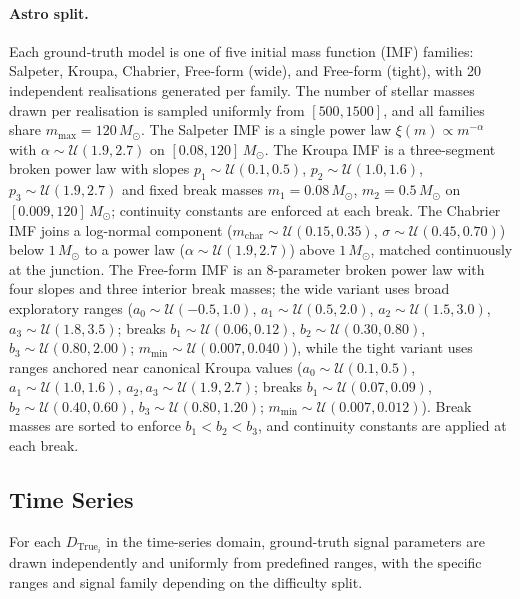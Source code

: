 \documentclass{article}
\begin{document}
\paragraph{Astro split.}
Each ground-truth model is one of five initial mass function (IMF) families:
Salpeter, Kroupa, Chabrier, Free-form (wide), and Free-form (tight), with 20
independent realisations generated per family. The number of stellar masses
drawn per realisation is sampled uniformly from $[500, 1500]$, and all
families share $m_{\max} = 120\,M_\odot$. The Salpeter IMF is a
single power law $\xi(m) \propto m^{-\alpha}$ with $\alpha \sim \mathcal{U}(1.9,
2.7)$ on $[0.08, 120]\,M_\odot$. The Kroupa IMF is a three-segment broken
power law with slopes $p_1 \sim \mathcal{U}(0.1, 0.5)$, $p_2 \sim
\mathcal{U}(1.0, 1.6)$, $p_3 \sim \mathcal{U}(1.9, 2.7)$ and fixed break
masses $m_1 = 0.08\,M_\odot$, $m_2 = 0.5\,M_\odot$ on $[0.009,
120]\,M_\odot$; continuity constants are enforced at each break. The Chabrier
IMF joins a log-normal component ($m_{\text{char}} \sim \mathcal{U}(0.15,
0.35)$, $\sigma \sim \mathcal{U}(0.45, 0.70)$) below $1\,M_\odot$ to a power
law ($\alpha \sim \mathcal{U}(1.9, 2.7)$) above $1\,M_\odot$, matched
continuously at the junction. The Free-form IMF is an 8-parameter broken power
law with four slopes and three interior break masses; the wide variant uses
broad exploratory ranges ($a_0 \!\sim\! \mathcal{U}(-0.5, 1.0)$,
$a_1 \!\sim\! \mathcal{U}(0.5, 2.0)$, $a_2 \!\sim\! \mathcal{U}(1.5, 3.0)$,
$a_3 \!\sim\! \mathcal{U}(1.8, 3.5)$; breaks $b_1 \!\sim\! \mathcal{U}(0.06,
0.12)$, $b_2 \!\sim\! \mathcal{U}(0.30, 0.80)$, $b_3 \!\sim\! \mathcal{U}(0.80,
2.00)$; $m_{\min} \!\sim\! \mathcal{U}(0.007, 0.040)$), while the tight variant
uses ranges anchored near canonical Kroupa values ($a_0 \!\sim\!
\mathcal{U}(0.1, 0.5)$, $a_1 \!\sim\! \mathcal{U}(1.0, 1.6)$,
$a_2, a_3 \!\sim\! \mathcal{U}(1.9, 2.7)$; breaks $b_1 \!\sim\!
\mathcal{U}(0.07, 0.09)$, $b_2 \!\sim\! \mathcal{U}(0.40, 0.60)$,
$b_3 \!\sim\! \mathcal{U}(0.80, 1.20)$; $m_{\min} \!\sim\! \mathcal{U}(0.007,
0.012)$). Break masses are sorted to enforce $b_1 < b_2 < b_3$, and
continuity constants are applied at each break.

\subsection{Time Series}

For each $D_{\text{True}_i}$ in the time-series domain, ground-truth signal
parameters are drawn independently and uniformly from predefined ranges, with
the specific ranges and signal family depending on the difficulty split.
\end{document}
